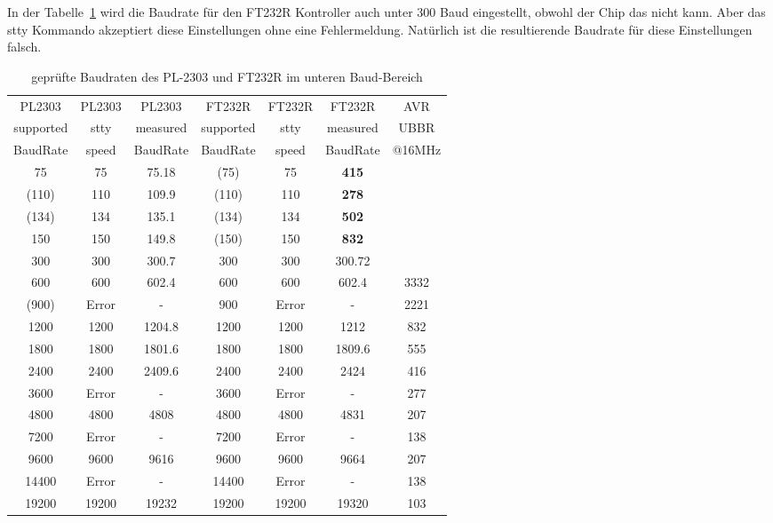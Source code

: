 In der Tabelle~\ref{tab:PL2302baudl} wird die Baudrate für den FT232R Kontroller
auch unter 300 Baud eingestellt, obwohl der Chip das nicht kann.
Aber das stty Kommando akzeptiert diese Einstellungen ohne eine Fehlermeldung.
Natürlich ist die resultierende Baudrate für diese Einstellungen falsch.

\begin{table}[H]
  \begin{center}
    \begin{tabular}{| c | c | c || c | c | c || c |}
    \hline
    PL2303     & PL2303 & PL2303   &  FT232R   & FT232R & FT232R    & AVR \\
    supported  & stty  & measured  & supported & stty   & measured  & UBBR  \\
    BaudRate   & speed & BaudRate  & BaudRate  & speed  & BaudRate  & @16MHz \\
    \hline
    \hline
         75    &  75   &  75.18    &  (75)     &   75   &  \bf{415}  &        \\
    \hline
      (110)    &  110  &  109.9    &  (110)    & 110    & \bf{278} &        \\
    \hline
      (134)    &  134  &  135.1    &  (134)    & 134    & \bf{502}   &       \\
    \hline
        150    & 150   &  149.8    &  (150)    & 150    & \bf{832} &        \\
    \hline
        300    & 300   &  300.7    &   300     & 300    & 300.72     &       \\
    \hline
        600    & 600   &  602.4    &   600     & 600    & 602.4     &  3332  \\
    \hline
      (900)    & Error &    -      &   900     & Error  &    -      &  2221 \\
    \hline
       1200    & 1200  &  1204.8   &   1200    & 1200   & 1212    &   832  \\
    \hline
       1800    & 1800  &  1801.6   &   1800    & 1800   & 1809.6    &   555 \\
    \hline
       2400    & 2400  &  2409.6   &   2400    & 2400   & 2424    &   416  \\
    \hline
       3600    & Error &   -       &   3600    & Error  &    -      &   277  \\
    \hline
       4800    & 4800  &  4808     &   4800    & 4800   & 4831      &   207  \\
    \hline
       7200    & Error &   -       &   7200    &  Error &    -      &   138  \\
    \hline
       9600    & 9600  &  9616     &   9600    &  9600  &  9664     &   207  \\
    \hline
      14400    & Error &   -       &  14400    & Error  &    -      &   138  \\
    \hline
      19200    & 19200  & 19232    &  19200    & 19200  & 19320     &   103  \\
    \hline
    \end{tabular}
  \end{center}
  \caption{geprüfte Baudraten des PL-2303 und FT232R im unteren Baud-Bereich}
  \label{tab:PL2302baudl}
\end{table}

